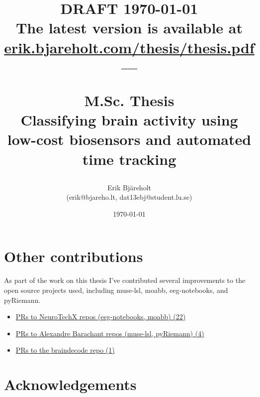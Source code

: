 \documentclass[a4paper]{article}
\title{%
    \small DRAFT \today \\
    \small The latest version is available at \href{https://erik.bjareholt.com/thesis/thesis.pdf}{erik.bjareholt.com/thesis/thesis.pdf}\\
    \large --- \\
    \large \par M.Sc. Thesis\\
    \huge Classifying brain activity using low-cost biosensors and automated time tracking \\
}
\author{Erik Bjäreholt \orcid{0000-0003-1350-9677} \\(erik@bjareho.lt, dat13ebj@student.lu.se)}
\date{\today}
\begin{document}
\maketitle

\begin{abstract}

\end{abstract}

\pagebreak %

\tableofcontents


\pagebreak %

\begin{refsection}









\section{Other contributions}

    As part of the work on this thesis I've contributed several improvements to the open source projects used, including muse-lsl, moabb, eeg-notebooks, and pyRiemann.

    \begin{itemize}
        \item \href{%
                https://github.com/search?q=org%
            }{PRs to NeuroTechX repos (eeg-notebooks, moabb) (22)}
        \item \href{%
                https://github.com/search?q=org%
            }{PRs to Alexandre Barachant repos (muse-lsl, pyRiemann) (4)}
        \item \href{%
                https://github.com/search?q=org%
            }{PRs to the braindecode repo (1)}
    \end{itemize}

\section*{Acknowledgements}


\end{refsection}
\end{document}
